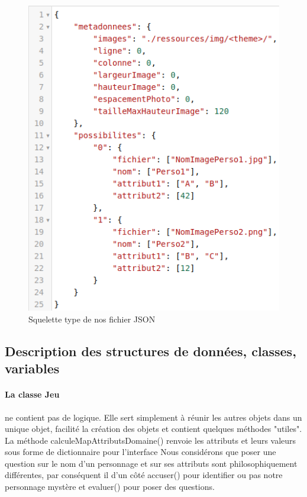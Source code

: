 \documentclass[a4paper]{article}
\begin{document}
\begin{figure}
  \caption{Squelette type de nos fichier JSON}
  \centering
  \includegraphics[scale=0.15]{./squeletteJSON.png}
\end{figure}

\clearpage
\subsection*{Description des structures de données, classes, variables}
\paragraph*{La classe Jeu} ne contient pas de logique. Elle sert simplement à réunir les autres objets dans un unique objet, facilité la création des objets et contient quelques méthodes "utiles".
La méthode calculeMapAttributsDomaine() renvoie les attributs et leurs valeurs sous forme de dictionnaire pour l'interface
Nous considérons que poser une question sur le nom d'un personnage et sur ses attributs sont philosophiquement différentes, par conséquent il d'un côté accuser() pour identifier ou pas notre personnage mystère et evaluer() pour poser des questions.
\end{document}
